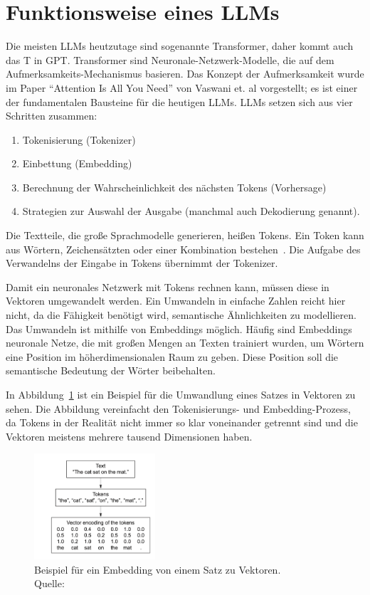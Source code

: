 \section{Funktionsweise eines LLMs}
Die meisten LLMs heutzutage sind sogenannte Transformer, daher kommt auch das T in GPT. Transformer sind Neuronale-Netzwerk-Modelle, die auf dem Aufmerksamkeits-Mechanismus basieren.
Das Konzept der Aufmerksamkeit wurde im Paper \enquote{Attention Is All You Need} \cite{2017arXiv170603762V} von Vaswani et. al vorgestellt; es ist einer der fundamentalen Bausteine für die heutigen LLMs.
LLMs setzen sich aus vier Schritten zusammen:
\begin{enumerate}
    \item Tokenisierung (Tokenizer)
    \item Einbettung (Embedding)
    \item Berechnung der Wahrscheinlichkeit des nächsten Tokens (Vorhersage)
    \item Strategien zur Auswahl der Ausgabe (manchmal auch Dekodierung genannt).
\end{enumerate}

Die Textteile, die große Sprachmodelle generieren, heißen Tokens. Ein Token kann aus Wörtern, Zeichensätzten oder einer Kombination bestehen~\cite{microsoft_dotnet_ai_tokens_2025}.
Die Aufgabe des Verwandelns der Eingabe in Tokens übernimmt der Tokenizer.

Damit ein neuronales Netzwerk mit Tokens rechnen kann, müssen diese in Vektoren umgewandelt werden.
Ein Umwandeln in einfache Zahlen reicht hier nicht, da die Fähigkeit benötigt wird, semantische Ähnlichkeiten zu modellieren.
Das Umwandeln ist mithilfe von Embeddings möglich.
Häufig sind Embeddings neuronale Netze, die mit großen Mengen an Texten trainiert wurden, um Wörtern eine Position im höherdimensionalen Raum zu geben.
Diese Position soll die semantische Bedeutung der Wörter beibehalten.

In Abbildung~\ref{fig:sentence_to_embedding} ist ein Beispiel für die Umwandlung eines Satzes in Vektoren zu sehen.
Die Abbildung vereinfacht den Tokenisierungs- und Embedding-Prozess, da Tokens in der Realität nicht immer so klar voneinander getrennt sind und die Vektoren meistens mehrere tausend Dimensionen haben.

\begin{figure}[h!]
    \centering
    \includegraphics[width=0.4\textwidth]{images/sentence_to_embedding}
    \caption[Embedding Beispiel]{Beispiel für ein Embedding von einem Satz zu Vektoren.\\Quelle:~\cite{chol18b}}
    \label{fig:sentence_to_embedding}
\end{figure}

